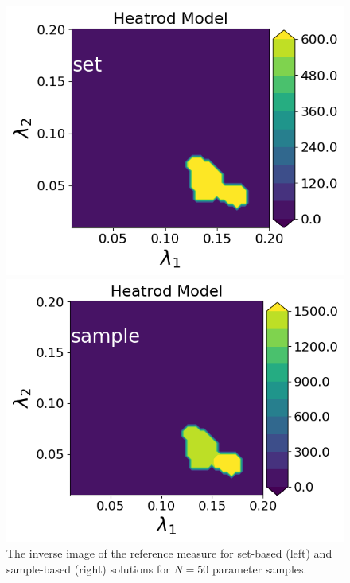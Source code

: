 \begin{figure}[h]
\begin{minipage}{.475\textwidth}
\includegraphics[width=\linewidth]{examples/fig_heatrod_q1/tHeatrodModel--set_N50_em.png}
\end{minipage}
\begin{minipage}{.475\textwidth}
\includegraphics[width=\linewidth]{examples/fig_heatrod_q1/tHeatrodModel--sample_N50_mc.png}
\end{minipage}
\caption{The inverse image of the reference measure for set-based (left) and sample-based (right) solutions for $N=50$ parameter samples.}
\label{fig:heatrod-sol-ex}
\end{figure}

